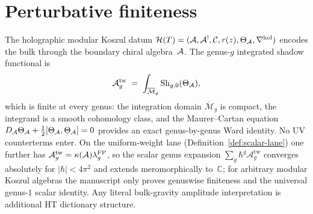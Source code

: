 %

\section{Perturbative finiteness}
\label{sec:thqg-perturbative-finiteness}

\providecommand{\HS}{\operatorname{HS}}
\providecommand{\Tr}{\operatorname{Tr}}
\providecommand{\Det}{\operatorname{Det}}
\providecommand{\Fred}{\operatorname{Fred}}
\providecommand{\rank}{\operatorname{rank}}
\providecommand{\Sym}{\operatorname{Sym}}
\providecommand{\id}{\mathrm{id}}
\providecommand{\ad}{\operatorname{ad}}
\providecommand{\wt}{\operatorname{wt}}
\providecommand{\Aut}{\operatorname{Aut}}
\providecommand{\Res}{\operatorname{Res}}
\providecommand{\Defcyc}{\operatorname{Def}_{\mathrm{cyc}}}
\providecommand{\gAmod}{\mathfrak{g}_{\cA}^{\mathrm{mod}}}
\providecommand{\Gmod}{\mathcal{G}^{\mathrm{mod}}}

The holographic modular Koszul datum $\mathcal{H}(T) = (\mathcal{A}, \mathcal{A}^!, \mathcal{C}, r(z), \Theta_{\mathcal{A}}, \nabla^{\mathrm{hol}})$ encodes the bulk through the boundary chiral algebra~$\mathcal{A}$. The genus-$g$ integrated shadow functional is
\[
\mathcal{A}_g^{\mathrm{tw}}
\;=\; \int_{\overline{\mathcal{M}}_g}
 \operatorname{Sh}_{g,0}(\Theta_{\mathcal{A}}),
\]
which is finite at every genus: the integration domain
$\overline{\mathcal{M}}_g$ is compact, the integrand is a smooth
cohomology class, and the Maurer--Cartan equation
$D_{\mathcal{A}}\Theta_{\mathcal{A}} + \tfrac{1}{2}[\Theta_{\mathcal{A}},\Theta_{\mathcal{A}}] = 0$ provides an
exact genus-by-genus Ward identity. No UV counterterms enter. On the
uniform-weight lane (Definition~\ref{def:scalar-lane}) one further has
$\mathcal{A}_g^{\mathrm{tw}}=\kappa(\mathcal{A})\lambda_g^{\mathrm{FP}}$, so the
scalar genus expansion $\sum_g \hbar^g \mathcal{A}_g^{\mathrm{tw}}$
converges absolutely for $|\hbar| < 4\pi^2$ and extends meromorphically
to~$\mathbb{C}$; for arbitrary modular Koszul algebras the manuscript
only proves genuswise finiteness and the universal genus-$1$ scalar
identity. Any literal bulk-gravity amplitude interpretation is
additional HT dictionary structure.

